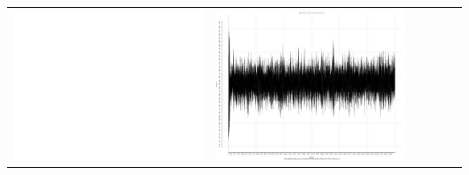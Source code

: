 \begin{table}[htbp]
{\begin{tabular}{l | ccccc}
\begin{minipage}{.15\textwidth}
     			 	\includegraphics[width=\linewidth]{images/mema-triple/N5}
    				 \end{minipage}
    			   &	 \begin{minipage}{.15\textwidth}
     			 	\includegraphics[width=\linewidth]{images/mema-triple/N9}
    				 \end{minipage}
    			   &	 \begin{minipage}{.15\textwidth}

\end{minipage}
\end{tabular}}
\end{table}
